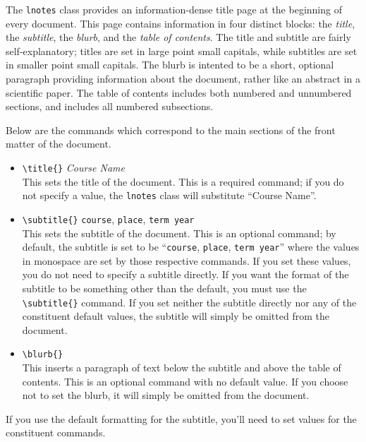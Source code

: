 \documentclass{lnotes}
\begin{document}
The \texttt{lnotes} class provides an information-dense title page at the beginning of every document. This page contains information in four distinct blocks: the \emph{title}, the \emph{subtitle}, the \emph{blurb}, and the \emph{table of contents}. The title and subtitle are fairly self-explanatory; titles are set in large point small capitals, while subtitles are set in smaller point small capitals. The blurb is intented to be a short, optional paragraph providing information about the document, rather like an abstract in a scientific paper. The table of contents includes both numbered and unnumbered sections, and includes all numbered subsections.

Below are the commands which correspond to the main sections of the front matter of the document.
\begin{itemize}
\item \verb|\title{}| \hfill \emph{Course Name} \\
This sets the title of the document. This is a required command; if you do not specify a value, the \texttt{lnotes} class will substitute ``Course Name''.
\item \verb|\subtitle{}| \hfill \texttt{course}, \texttt{place}, \texttt{term year} \\
This sets the subtitle of the document. This is an optional command; by default, the subtitle is set to be ``\texttt{course}, \texttt{place}, \texttt{term year}'' where the values in monospace are set by those respective commands. If you set these values, you do not need to specify a subtitle directly. If you want the format of the subtitle to be something other than the default, you must use the \verb|\subtitle{}| command. If you set neither the subtitle directly nor any of the constituent default values, the subtitle will simply be omitted from the document.
\item \verb|\blurb{}| \\
This inserts a paragraph of text below the subtitle and above the table of contents. This is an optional command with no default value. If you choose not to set the blurb, it will simply be omitted from the document.
\end{itemize}
If you use the default formatting for the subtitle, you'll need to set values for the constituent commands.
\end{document}

